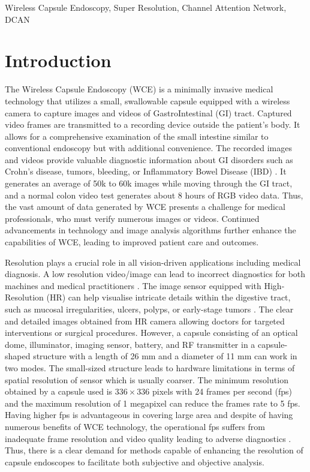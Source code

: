 \documentclass[conference]{IEEEtran}
\begin{document}
\begin{IEEEkeywords}
Wireless Capsule Endoscopy, Super Resolution, Channel Attention Network, DCAN
\end{IEEEkeywords}

\section{Introduction}
The Wireless Capsule Endoscopy (WCE) is a minimally invasive medical technology that utilizes a small, swallowable capsule equipped with a wireless camera to capture images and videos of GastroIntestinal (GI) tract. Captured video frames are transmitted to a recording device outside the patient's body. It allows for a comprehensive examination of the small intestine similar to conventional endoscopy but with additional convenience. The recorded images and videos provide valuable diagnostic information about GI disorders such as Crohn's disease, tumors, bleeding, or Inflammatory Bowel Disease (IBD) \cite{WCE}. It generates an average of 50k to 60k images while moving through the GI tract, and a normal colon video test generates about 8 hours of RGB video data. Thus, the vast amount of data generated by WCE presents a challenge for medical professionals, who must verify numerous images or videos. Continued advancements in technology and image analysis algorithms further enhance the capabilities of WCE, leading to improved patient care and outcomes.

Resolution plays a crucial role in all vision-driven applications including medical diagnosis. A low resolution video/image can lead to incorrect diagnostics for both machines and medical practitioners \cite{WCE2}. The image sensor equipped with High-Resolution (HR) can help visualise intricate details within the digestive tract, such as mucosal irregularities, ulcers, polyps, or early-stage tumors \cite{WCE3}. The clear and detailed images obtained from HR camera allowing doctors for targeted interventions or surgical procedures. However, a capsule consisting of an optical dome, illuminator, imaging sensor, battery, and RF transmitter in a capsule-shaped structure with a length of 26 mm and a diameter of 11 mm \cite{WCE} can work in two modes. The small-sized structure leads to hardware limitations in terms of spatial resolution of sensor which is usually coarser. The minimum resolution obtained by a capsule used is $336 \times 336$ pixels with 24 frames per second (fps) \cite{data} and the maximum resolution of 1 megapixel can reduce the frames rate to 5 fps. Having higher fps is advantageous in covering large area and despite of having numerous benefits of WCE technology, the operational fps suffers from inadequate frame resolution and video quality leading to adverse diagnostics \cite{lowres}. Thus, there is a clear demand for methods capable of enhancing the resolution of capsule endoscopes to facilitate both subjective and objective analysis.
\end{document}

